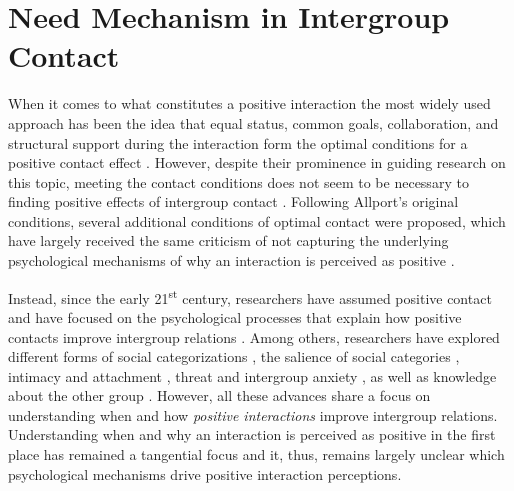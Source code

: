 \documentclass[man, 12pt, a4paper, mask]{apa7}
\theoremstyle{break}
\theoremstyle{plain}
\begin{document}
\section{Need Mechanism in Intergroup Contact}
When it comes to what constitutes a positive interaction the most widely used approach has been the idea that equal status, common goals, collaboration, and structural support during the interaction form the optimal conditions for a positive contact effect \citep[][]{Allport1954b, Pettigrew1969}. However, despite their prominence in guiding research on this topic, meeting the contact conditions does not seem to be necessary to finding positive effects of intergroup contact \citep[][]{Pettigrew2006}. Following Allport's original conditions, several additional conditions of optimal contact were proposed, which have largely received the same criticism of not capturing the underlying psychological mechanisms of why an interaction is perceived as positive \citep[for a critical discussion see][]{Pettigrew1986}.

Instead, since the early 21\textsuperscript{st} century, researchers have assumed positive contact and have focused on the psychological processes that explain how positive contacts improve intergroup relations \citep[e.g. see,][]{Paolini2021}. Among others, researchers have explored different forms of social categorizations \citep[][]{Pettigrew1998}, the salience of social categories \citep[][]{Brown2005}, intimacy \citep[e.g.,][]{Marinucci2021} and attachment \citep[e.g.,][]{Tropp2021}, threat and intergroup anxiety \citep[e.g.,][]{Stephan2008}, as well as knowledge about the other group \citep[][]{Pettigrew2008c}. However, all these advances share a focus on understanding when and how \textit{positive interactions} improve intergroup relations. Understanding when and why an interaction is perceived as positive in the first place has remained a tangential focus and it, thus, remains largely unclear which psychological mechanisms drive positive interaction perceptions. 
\end{document}
